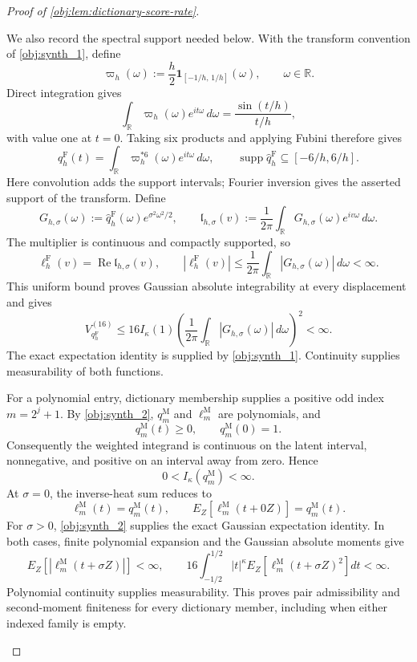\begin{proof}[Proof of \cref{obj:lem:dictionary-score-rate}]
\begin{enumerate}
We also record the spectral support needed below. With the transform convention of \cref{obj:synth_1}, define
\[
\varpi_h(\omega):=\frac h2\mathbf1_{[-1/h,\,1/h]}(\omega),
\qquad \omega\in\mathbb R.
\]
Direct integration gives
\[
\int_{\mathbb R}\varpi_h(\omega)e^{it\omega}\,d\omega
=\frac{\sin(t/h)}{t/h},
\]
with value one at \(t=0\). Taking six products and applying Fubini therefore gives
\[
q_h^{\mathrm F}(t)
=\int_{\mathbb R}\varpi_h^{*6}(\omega)e^{it\omega}\,d\omega,
\qquad
\operatorname{supp}\widehat q_h^{\mathrm F}
\subseteq[-6/h,6/h].
\]
Here convolution adds the support intervals; Fourier inversion gives the asserted support of the transform. Define
\[
G_{h,\sigma}(\omega)
:=\widehat q_h^{\mathrm F}(\omega)e^{\sigma^2\omega^2/2},
\qquad
\mathfrak l_{h,\sigma}(v)
:=\frac1{2\pi}\int_{\mathbb R}G_{h,\sigma}(\omega)e^{iv\omega}\,d\omega.
\]
The multiplier is continuous and compactly supported, so
\[
\ell_h^{\mathrm F}(v)=\operatorname{Re}\mathfrak l_{h,\sigma}(v),
\qquad
|\ell_h^{\mathrm F}(v)|
\le\frac1{2\pi}\int_{\mathbb R}|G_{h,\sigma}(\omega)|\,d\omega<\infty.
\]
This uniform bound proves Gaussian absolute integrability at every displacement and gives
\[
V_{q_h^{\mathrm F}}^{(16)}
\le
16I_\kappa(1)
\left(\frac1{2\pi}\int_{\mathbb R}|G_{h,\sigma}(\omega)|\,d\omega\right)^2
<\infty.
\]
The exact expectation identity is supplied by \cref{obj:synth_1}. Continuity supplies measurability of both functions.

For a polynomial entry, dictionary membership supplies a positive odd index \(m=2^j+1\). By \cref{obj:synth_2}, \(q_m^{\mathrm M}\) and \(\ell_m^{\mathrm M}\) are polynomials, and
\[
q_m^{\mathrm M}(t)\ge0,
\qquad
q_m^{\mathrm M}(0)=1.
\]
Consequently the weighted integrand is continuous on the latent interval, nonnegative, and positive on an interval away from zero. Hence
\[
0<I_\kappa(q_m^{\mathrm M})<\infty.
\]
At \(\sigma=0\), the inverse-heat sum reduces to
\[
\ell_m^{\mathrm M}(t)=q_m^{\mathrm M}(t),
\qquad
E_Z[\ell_m^{\mathrm M}(t+0Z)]=q_m^{\mathrm M}(t).
\]
For \(\sigma>0\), \cref{obj:synth_2} supplies the exact Gaussian expectation identity. In both cases, finite polynomial expansion and the Gaussian absolute moments give
\[
E_Z\!\left[|\ell_m^{\mathrm M}(t+\sigma Z)|\right]<\infty,
\qquad
16\int_{-1/2}^{1/2}|t|^\kappa
E_Z\!\left[\ell_m^{\mathrm M}(t+\sigma Z)^2\right]dt<\infty.
\]
Polynomial continuity supplies measurability. This proves pair admissibility and second-moment finiteness for every dictionary member, including when either indexed family is empty.


\end{enumerate}
\end{proof}
